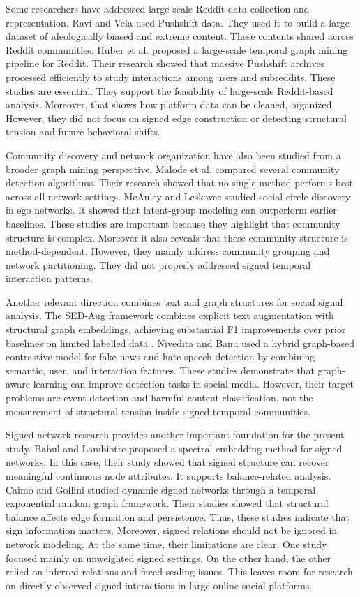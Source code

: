 \documentclass[a4paper,fleqn]{cas-dc}
\begin{document}
Some researchers have addressed large-scale Reddit data collection and representation. Ravi and Vela \cite{4_Ravi2024} used Pushshift data. They used it to build a large dataset of ideologically biased and extreme content. These contents shared across Reddit communities. Huber et al. \cite{5_Huber2022} proposed a large-scale temporal graph mining pipeline for Reddit. Their research  showed that massive Pushshift archives processed efficiently to study interactions among users and subreddits. These studies are essential. They support the feasibility of large-scale Reddit-based analysis. Moreover, that shows how platform data can be cleaned, organized. However, they did not focus on signed edge construction or detecting structural tension and future behavioral shifts. 

Community discovery and network organization have also been studied from a broader graph mining perspective. Malode et al. \cite{6_Malode2025} compared several community detection algorithms. Their research showed that no single method performs best across all network settings. McAuley and Leskovec \cite{14_McAuley2012} studied social circle discovery in ego networks. It showed that latent-group modeling can outperform earlier baselines. These studies are important because they highlight that community structure is complex. Moreover it also reveals that these community structure is method-dependent. However, they mainly address community grouping and network partitioning. They did not properly addressed signed temporal interaction patterns.

Another relevant direction combines text and graph structures for social signal analysis. The SED-Aug framework combines explicit text augmentation with structural graph embeddings, achieving substantial F1 improvements over prior baselines on limited labelled data \cite{8_ma2025}. Nivedita and Banu \cite{11_Nivedita2025} used a hybrid graph-based contrastive model for fake news and hate speech detection by combining semantic, user, and interaction features. These studies demonstrate that graph-aware learning can improve detection tasks in social media. However, their target problems are event detection and harmful content classification, not the measurement of structural tension inside signed temporal communities.  

Signed network research provides another important foundation for the present study. Babul and Lambiotte  \cite{12_Babul2024} proposed a spectral embedding method for signed networks. In this case, their study showed that signed structure can recover meaningful continuous node attributes. It supports balance-related analysis. Caimo and Gollini \cite{13_caimo2026} studied dynamic signed networks through a temporal exponential random graph framework. Their studies showed that structural balance affects edge formation and persistence. Thus, these studies indicate that sign information matters. Moreover, signed relations should not be ignored in network modeling. At the same time, their limitations are clear. One study focused mainly on unweighted signed settings. On the other hand, the other relied on inferred relations and faced scaling issues. This leaves room for research on directly observed signed interactions in large online social platforms. 
\end{document}
